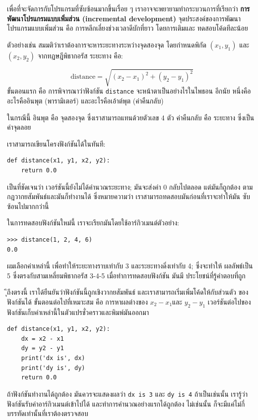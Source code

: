 เพื่อที่จะจัดการกับโปรแกรมที่ซับซ้อนมากขึ้นเรื่อย ๆ เราอาจจะพยายามทำกระบวนการที่เรียกว่า
{\bf การพัฒนาโปรแกรมแบบเพิ่มส่วน (incremental development)} จุดประสงค์ของการพัฒนา
โปรแกรมแบบเพิ่มส่วน คือ การหลีกเลี่ยงช่วงเวลาดีบักที่ยาว โดยการเติมและ
ทดสอบโค้ดทีละน้อย 

ตัวอย่างเช่น สมมติว่าเราต้องการจะหาระยะทางระหว่างจุดสองจุด โดยกำหนดพิกัด $(x_1, y_1)$ และ $(x_2, y_2)$
จากทฏษฎีพิธากอรัส ระยะทาง คือ:

\begin{displaymath}
\mathrm{distance} = \sqrt{(x_2 - x_1)^2 + (y_2 - y_1)^2}
\end{displaymath}
%
ขั้นตอนแรก คือ การพิจารณาว่าฟังก์ชัน {\tt distance} จะหน้าตาเป็นอย่างไรในไพธอน อีกนัย
หนึ่งคือ อะไรคืออินพุต (พารามิเตอร์) และอะไรคือเอ้าต์พุต (ค่าคืนกลับ)

ในกรณีนี้ อินพุต คือ จุดสองจุด ซึ่งเราสามารถแทนด้วยตัวเลข 4 ตัว ค่าคืนกลับ คือ
ระยะทาง ซึ่งเป็นค่าจุดลอย

เราสามารถเขียนโครงฟังก์ชันได้ในทันที:

\begin{verbatim}
def distance(x1, y1, x2, y2):
    return 0.0
\end{verbatim}
%
เป็นที่ชัดเจนว่า เวอร์ชันนี้ยังไม่ได้คำนวณระยะทาง; มันจะส่งค่า 0 กลับไปตลอด แต่มันก็ถูกต้อง
ตามกฎวากยสัมพันธ์และมันก็ทำงานได้ ซึ่งหมายความว่า เราสามารถทดสอบมันก่อนที่เราจะทำให้มัน
ซับซ้อนไปมากกว่านี้

ในการทดสอบฟังก์ชันใหม่นี้ เราจะเรียกมันโดยใช้อาร์กิวเมนต์ตัวอย่าง:

\begin{verbatim}
>>> distance(1, 2, 4, 6)
0.0
\end{verbatim}
%
ผมเลือกค่าเหล่านี้ เพื่อทำให้ระยะทางราบเท่ากับ 3 และระยะทางดิ่งเท่ากับ 4; ซึ่งจะทำให้
ผลลัพธ์เป็น 5 ซึ่งตรงกับสามเหลี่ยมพิธากอรัส 3-4-5 เมื่อทำการทดสอบฟังก์ชัน มันมี
ประโยชน์ที่รู้คำตอบที่ถูก

ุึถึงตรงนี้ เราได้ยืนยันว่าฟังก์ชันนี้ถูกเชิงวากยสัมพันธ์ และเราสามารถเริ่มเพิ่มโค้ดให้กับส่วนตัว
ของฟังก์ชันได้ ขั้นตอนต่อไปที่เหมาะสม คือ การหาผลต่างของ $x_2 - x_1$และ $y_2 - y_1$ 
เวอร์ชันต่อไปของฟังก์ชันเก็บค่าเหล่านี้ในตัวแปรชั่วคราวและพิมพ์มันออกมา

\begin{verbatim}
def distance(x1, y1, x2, y2):
    dx = x2 - x1
    dy = y2 - y1
    print('dx is', dx)
    print('dy is', dy)
    return 0.0
\end{verbatim}
%
ถ้าฟังก์ชันทำงานได้ถูกต้อง มันควรจะแสดงผลว่า \verb"dx is 3" และ \verb"dy is 4" 
ถ้าเป็นเช่นนั้น เรารู้ว่าฟังก์ชันรับค่าอาร์กิวเมนต์เข้าไปได้ และทำการคำนวณอย่างแรกได้ถูกต้อง 
ไม่เช่นนั้น ก็จะมีแค่ไม่กี่บรรทัดเท่านั้นที่เราต้องตรวจสอบ

